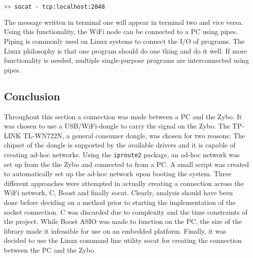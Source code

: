 \begin{lstlisting}[language=bash]
>> socat - tcp:localhost:2048
\end{lstlisting}

The message written in terminal one will appear in terminal two and vice versa.
Using this functionality, the WiFi node can be connected to a PC using pipes.
Piping is commonly used on Linux systems to connect the I/O of programs.
The Linux philosophy is that one program should do one thing and do it well.
If more functionality is needed, multiple single-purpose programs are interconnected using pipes.

\subsection{Conclusion}

Throughout this section a connection was made between a PC and the Zybo.
It was chosen to use a USB/WiFi-dongle to carry the signal on the Zybo.
The TP-LINK TL-WN722N, a general consumer dongle, was chosen for two reasons: The chipset of the dongle is supported by the available drivers and it is capable of creating ad-hoc networks.
Using the \texttt{iproute2} package, an ad-hoc network was set up from the the Zybo and connected to from a PC.
A small script was created to automatically set up the ad-hoc network upon booting the system.
Three different approaches were attempted in actually creating a connection across the WiFi network, C, Boost and finally socat.
Clearly, analysis should have been done before deciding on a method prior to starting the implementation of the socket connection.
C was discarded due to complexity and the time constraints of the project.
While Boost ASIO was made to function on the PC, the size of the library made it infeasible for use on an embedded platform.
Finally, it was decided to use the Linux command line utility socat for creating the connection between the PC and the Zybo.